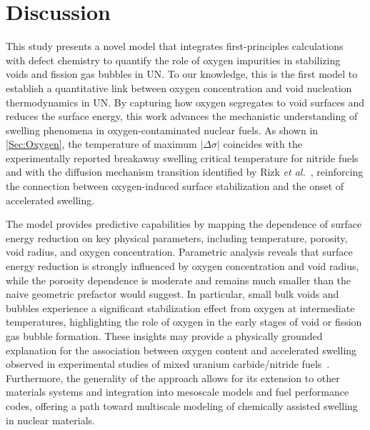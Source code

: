 \documentclass[preprint,12pt,sort&compress]{elsarticle}
\newcommand{\?}{\stackrel{?}{=}}
\begin{document}
\section{Discussion}
\label{Sec:Discuss}

This study presents a novel model that integrates first-principles calculations with defect chemistry to quantify the role of oxygen impurities in stabilizing voids and fission gas bubbles in UN. To our knowledge, this is the first model to establish a quantitative link between oxygen concentration and void nucleation thermodynamics in UN. By capturing how oxygen segregates to void surfaces and reduces the surface energy, this work advances the mechanistic understanding of swelling phenomena in oxygen-contaminated nuclear fuels. As shown in \cref{Sec:Oxygen}, the temperature of maximum $|\Delta \sigma|$ coincides with the experimentally reported breakaway swelling critical temperature for nitride fuels~\cite{Ronchi1978} and with the diffusion mechanism transition identified by Rizk \textit{et al.}~\cite{Rizk2025}, reinforcing the connection between oxygen-induced surface stabilization and the onset of accelerated swelling.


The model provides predictive capabilities by mapping the dependence of surface energy reduction on key physical parameters, including temperature, porosity, void radius, and oxygen concentration. Parametric analysis reveals that surface energy reduction is strongly influenced by oxygen concentration and void radius, while the porosity dependence is moderate and remains much smaller than the naive geometric prefactor would suggest. In particular, small bulk voids and bubbles experience a significant stabilization effect from oxygen at intermediate temperatures, highlighting the role of oxygen in the early stages of void or fission gas bubble formation. These insights may provide a physically grounded explanation for the association between oxygen content and accelerated swelling observed in experimental studies of mixed uranium carbide/nitride fuels~\cite{Rogozkin2003}. Furthermore, the generality of the approach allows for its extension to other materials systems and integration into mesoscale models and fuel performance codes, offering a path toward multiscale modeling of chemically assisted swelling in nuclear materials.
\end{document}
